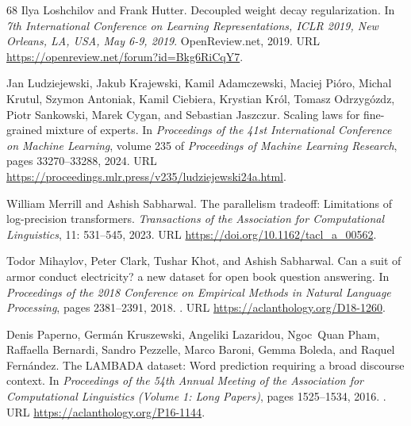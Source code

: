 \documentclass[]{bytedance_seed}
\theoremstyle{definition}
\theoremstyle{remark}
\begin{document}
\begin{thebibliography}{68}
Ilya Loshchilov and Frank Hutter.
\newblock Decoupled weight decay regularization.
\newblock In \emph{7th International Conference on Learning Representations,
  {ICLR} 2019, New Orleans, LA, USA, May 6-9, 2019}. OpenReview.net, 2019.
\newblock URL \url{https://openreview.net/forum?id=Bkg6RiCqY7}.

Jan Ludziejewski, Jakub Krajewski, Kamil Adamczewski, Maciej Pi{\'o}ro, Michal
  Krutul, Szymon Antoniak, Kamil Ciebiera, Krystian Kr{\'o}l, Tomasz
  Odrzyg{\'o}zdz, Piotr Sankowski, Marek Cygan, and Sebastian Jaszczur.
\newblock Scaling laws for fine-grained mixture of experts.
\newblock In \emph{Proceedings of the 41st International Conference on Machine
  Learning}, volume 235 of \emph{Proceedings of Machine Learning Research},
  pages 33270--33288, 2024.
\newblock URL \url{https://proceedings.mlr.press/v235/ludziejewski24a.html}.

William Merrill and Ashish Sabharwal.
\newblock The parallelism tradeoff: Limitations of log-precision transformers.
\newblock \emph{Transactions of the Association for Computational Linguistics},
  11: 531--545, 2023.
\newblock URL \url{https://doi.org/10.1162/tacl_a_00562}.

Todor Mihaylov, Peter Clark, Tushar Khot, and Ashish Sabharwal.
\newblock Can a suit of armor conduct electricity? a new dataset for open book
  question answering.
\newblock In \emph{Proceedings of the 2018 Conference on Empirical Methods in
  Natural Language Processing}, pages 2381--2391, 2018.
\newblock {}.
\newblock URL \url{https://aclanthology.org/D18-1260}.

Denis Paperno, Germ{\'a}n Kruszewski, Angeliki Lazaridou, Ngoc~Quan Pham,
  Raffaella Bernardi, Sandro Pezzelle, Marco Baroni, Gemma Boleda, and Raquel
  Fern{\'a}ndez.
\newblock The {LAMBADA} dataset: Word prediction requiring a broad discourse
  context.
\newblock In \emph{Proceedings of the 54th Annual Meeting of the Association
  for Computational Linguistics (Volume 1: Long Papers)}, pages 1525--1534,
  2016.
\newblock {}.
\newblock URL \url{https://aclanthology.org/P16-1144}.


\end{thebibliography}
\end{document}
